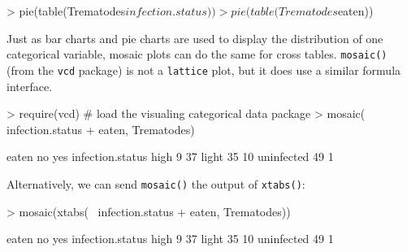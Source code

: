 \begin{Schunk}
\begin{Sinput}
> pie(table(Trematodes$infection.status))
> pie(table(Trematodes$eaten))
\end{Sinput}
\end{Schunk}
\fi

Just as bar charts and pie charts are used to display the distribution
of one categorical variable,  mosaic plots can do the same for cross tables.
\verb!mosaic()! (from the \verb!vcd! package) is not a \verb!lattice! plot, 
but it does use a similar formula interface.  %

\begin{Schunk}
\begin{Sinput}
> require(vcd)                              # load the visualing categorical data package
> mosaic(~ infection.status + eaten, Trematodes)
\end{Sinput}
\begin{Soutput}
                 eaten no yes
infection.status             
high                    9  37
light                  35  10
uninfected             49   1
\end{Soutput}
\end{Schunk}


Alternatively, we can send \verb!mosaic()! the output of \verb!xtabs()!:
\begin{center}
\begin{Schunk}
\begin{Sinput}
> mosaic(xtabs(~ infection.status + eaten, Trematodes))
\end{Sinput}
\begin{Soutput}
                 eaten no yes
infection.status             
high                    9  37
light                  35  10
uninfected             49   1
\end{Soutput}
\end{Schunk}
\end{center}

